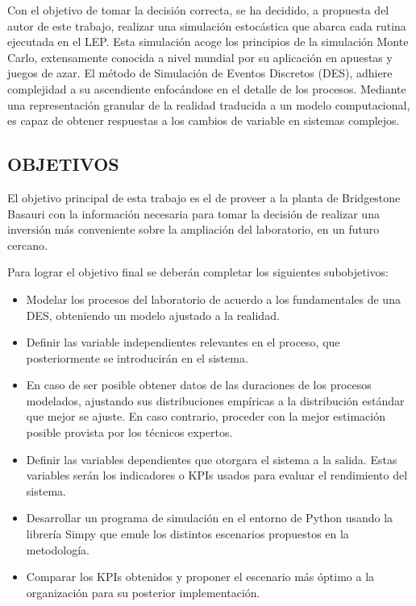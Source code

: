 Con el objetivo de tomar la decisión correcta, se ha decidido, a propuesta del autor de este trabajo, realizar una simulación estocástica que abarca cada rutina ejecutada en el LEP. Esta simulación acoge los principios de la simulación Monte Carlo, extensamente conocida a nivel mundial por su aplicación en apuestas y juegos de azar. El método de Simulación de Eventos Discretos (DES), adhiere complejidad a su ascendiente enfocándose en el detalle de los procesos. Mediante una representación  granular de la realidad traducida a un modelo computacional, es capaz de obtener respuestas a los cambios de variable en sistemas complejos.
 
\subsection{OBJETIVOS}

El objetivo principal de esta trabajo es el de proveer a la planta de Bridgestone Basauri con la información necesaria para tomar la decisión de realizar una inversión más conveniente sobre la ampliación del laboratorio, en un futuro cercano.

Para lograr el objetivo final se deberán completar los siguientes subobjetivos:

\begin{itemize}
  \item Modelar los procesos del laboratorio de acuerdo a los fundamentales de una DES, obteniendo un modelo ajustado a la realidad.
  \item Definir las variable independientes relevantes en el proceso, que posteriormente se introducirán en el sistema.
  \item En caso de ser posible obtener datos de las duraciones de los procesos modelados, ajustando sus distribuciones empíricas a la distribución estándar que mejor se ajuste. En caso contrario, proceder con la mejor estimación posible provista por los técnicos expertos.
  \item Definir las variables dependientes que otorgara el sistema a la salida. Estas variables serán los indicadores o KPIs usados para evaluar el rendimiento del sistema.
  \item Desarrollar un programa de simulación en el entorno de Python usando la librería Simpy que emule los distintos escenarios propuestos en la metodología.
  \item Comparar los KPIs obtenidos y proponer el escenario más óptimo a la organización para su posterior implementación.
\end{itemize}

